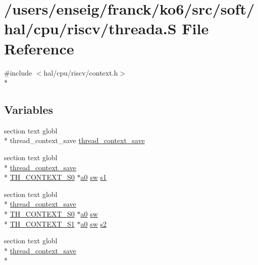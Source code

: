 \hypertarget{riscv_2threada_8S}{\section{/users/enseig/franck/ko6/src/soft/hal/cpu/riscv/threada.S File Reference}
\label{riscv_2threada_8S}
}
{\ttfamily \#include $<$hal/cpu/riscv/context.\-h$>$}\\*
\subsection*{Variables}
\begin{DoxyCompactItemize}
\item 
section text globl \\*
thread\-\_\-context\-\_\-save \hyperlink{riscv_2threada_8S_a89372006bcc54436099a65419c7895d7}{thread\-\_\-context\-\_\-save}
\item 
section text globl \\*
\hyperlink{thread_8h_a4ec481f4858f7894f48f951d1a59e868}{thread\-\_\-context\-\_\-save} \\*
\hyperlink{riscv_2context_8h_a820f77abfecbcda42a4a08f9993ecafc}{T\-H\-\_\-\-C\-O\-N\-T\-E\-X\-T\-\_\-\-S0} $\ast$\hyperlink{riscv_2threada_8S_aaef62817c8f68f920ec8214f18b86a4c}{a0} \hyperlink{mips_2threada_8S_a0616a0b0d185f884abf396081cef7c0d}{sw} \hyperlink{riscv_2threada_8S_afb19fa20b2f6715401f73ba9d4f1d177}{s1}
\item 
section text globl \\*
\hyperlink{thread_8h_a4ec481f4858f7894f48f951d1a59e868}{thread\-\_\-context\-\_\-save} \\*
\hyperlink{riscv_2context_8h_a820f77abfecbcda42a4a08f9993ecafc}{T\-H\-\_\-\-C\-O\-N\-T\-E\-X\-T\-\_\-\-S0} $\ast$\hyperlink{riscv_2threada_8S_aaef62817c8f68f920ec8214f18b86a4c}{a0} \hyperlink{mips_2threada_8S_a0616a0b0d185f884abf396081cef7c0d}{sw} \\*
\hyperlink{riscv_2context_8h_aab72df921d27ad69e4e9df4bf0efb042}{T\-H\-\_\-\-C\-O\-N\-T\-E\-X\-T\-\_\-\-S1} $\ast$\hyperlink{riscv_2threada_8S_aaef62817c8f68f920ec8214f18b86a4c}{a0} \hyperlink{mips_2threada_8S_a0616a0b0d185f884abf396081cef7c0d}{sw} \hyperlink{riscv_2threada_8S_a471d090c1a9e7f788067d9f57a793ec5}{s2}
\item 
section text globl \\*
\hyperlink{thread_8h_a4ec481f4858f7894f48f951d1a59e868}{thread\-\_\-context\-\_\-save} \\*

\end{DoxyCompactItemize}
